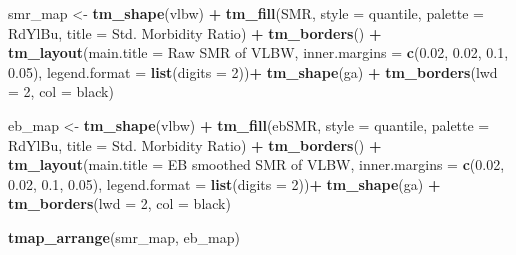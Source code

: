 \documentclass[
]{book}
\newenvironment{Shaded}{\begin{snugshade}}{\end{snugshade}}
\newcommand{\AttributeTok}[1]{\textcolor[rgb]{0.13,0.29,0.53}{#1}}
\newcommand{\DecValTok}[1]{\textcolor[rgb]{0.00,0.00,0.81}{#1}}
\newcommand{\FloatTok}[1]{\textcolor[rgb]{0.00,0.00,0.81}{#1}}
\newcommand{\FunctionTok}[1]{\textcolor[rgb]{0.13,0.29,0.53}{\textbf{#1}}}
\newcommand{\NormalTok}[1]{#1}
\newcommand{\OtherTok}[1]{\textcolor[rgb]{0.56,0.35,0.01}{#1}}
\newcommand{\SpecialCharTok}[1]{\textcolor[rgb]{0.81,0.36,0.00}{\textbf{#1}}}
\newcommand{\StringTok}[1]{\textcolor[rgb]{0.31,0.60,0.02}{#1}}
\begin{document}
\begin{Shaded}
\begin{Highlighting}[]
\NormalTok{smr\_map }\OtherTok{\textless{}{-}} \FunctionTok{tm\_shape}\NormalTok{(vlbw) }\SpecialCharTok{+}
  \FunctionTok{tm\_fill}\NormalTok{(}\StringTok{\textquotesingle{}SMR\textquotesingle{}}\NormalTok{,}
          \AttributeTok{style =} \StringTok{\textquotesingle{}quantile\textquotesingle{}}\NormalTok{, }\AttributeTok{palette =} \StringTok{\textquotesingle{}{-}RdYlBu\textquotesingle{}}\NormalTok{,}
          \AttributeTok{title =} \StringTok{\textquotesingle{}Std. Morbidity Ratio\textquotesingle{}}\NormalTok{) }\SpecialCharTok{+} 
  \FunctionTok{tm\_borders}\NormalTok{() }\SpecialCharTok{+}
  \FunctionTok{tm\_layout}\NormalTok{(}\AttributeTok{main.title =} \StringTok{\textquotesingle{}Raw SMR of VLBW\textquotesingle{}}\NormalTok{,}
            \AttributeTok{inner.margins =} \FunctionTok{c}\NormalTok{(}\FloatTok{0.02}\NormalTok{, }\FloatTok{0.02}\NormalTok{, }\FloatTok{0.1}\NormalTok{, }\FloatTok{0.05}\NormalTok{),}
            \AttributeTok{legend.format =} \FunctionTok{list}\NormalTok{(}\AttributeTok{digits =} \DecValTok{2}\NormalTok{))}\SpecialCharTok{+}
  \FunctionTok{tm\_shape}\NormalTok{(ga) }\SpecialCharTok{+}
  \FunctionTok{tm\_borders}\NormalTok{(}\AttributeTok{lwd =} \DecValTok{2}\NormalTok{, }\AttributeTok{col =} \StringTok{\textquotesingle{}black\textquotesingle{}}\NormalTok{)}

\NormalTok{eb\_map }\OtherTok{\textless{}{-}} \FunctionTok{tm\_shape}\NormalTok{(vlbw) }\SpecialCharTok{+}
  \FunctionTok{tm\_fill}\NormalTok{(}\StringTok{\textquotesingle{}ebSMR\textquotesingle{}}\NormalTok{,}
          \AttributeTok{style =} \StringTok{\textquotesingle{}quantile\textquotesingle{}}\NormalTok{, }
          \AttributeTok{palette =} \StringTok{\textquotesingle{}{-}RdYlBu\textquotesingle{}}\NormalTok{,}
          \AttributeTok{title =} \StringTok{\textquotesingle{}Std. Morbidity Ratio\textquotesingle{}}\NormalTok{) }\SpecialCharTok{+} 
  \FunctionTok{tm\_borders}\NormalTok{() }\SpecialCharTok{+}
  \FunctionTok{tm\_layout}\NormalTok{(}\AttributeTok{main.title =} \StringTok{\textquotesingle{}EB smoothed SMR of VLBW\textquotesingle{}}\NormalTok{,}
            \AttributeTok{inner.margins =} \FunctionTok{c}\NormalTok{(}\FloatTok{0.02}\NormalTok{, }\FloatTok{0.02}\NormalTok{, }\FloatTok{0.1}\NormalTok{, }\FloatTok{0.05}\NormalTok{),}
            \AttributeTok{legend.format =} \FunctionTok{list}\NormalTok{(}\AttributeTok{digits =} \DecValTok{2}\NormalTok{))}\SpecialCharTok{+}
  \FunctionTok{tm\_shape}\NormalTok{(ga) }\SpecialCharTok{+}
  \FunctionTok{tm\_borders}\NormalTok{(}\AttributeTok{lwd =} \DecValTok{2}\NormalTok{, }\AttributeTok{col =} \StringTok{\textquotesingle{}black\textquotesingle{}}\NormalTok{)}

\FunctionTok{tmap\_arrange}\NormalTok{(smr\_map, eb\_map)}
\end{Highlighting}
\end{Shaded}
\end{document}
